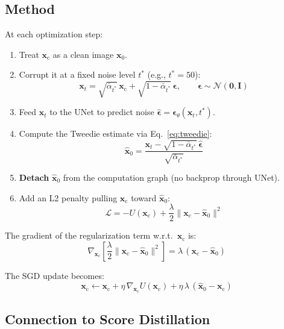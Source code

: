 \documentclass[11pt]{article}
\newcommand{\xb}{\mathbf{x}}
\newcommand{\xc}{\xb_{\mathrm{c}}}  %
\newcommand{\eb}{\boldsymbol{\epsilon}}
\newcommand{\Ib}{\mathbf{I}}
\newcommand{\alphabar}{\bar{\alpha}}
\begin{document}
\subsection{Method}

At each optimization step:
\begin{enumerate}[nosep]
    \item Treat $\xc$ as a clean image $\xb_0$.
    \item Corrupt it at a fixed noise level $t^*$ (e.g., $t^* = 50$):
    \begin{equation}
        \xb_t = \sqrt{\alphabar_{t^*}}\, \xc + \sqrt{1 - \alphabar_{t^*}}\, \eb,
        \qquad \eb \sim \mathcal{N}(\mathbf{0}, \Ib)
        \label{eq:corrupt}
    \end{equation}
    \item Feed $\xb_t$ to the UNet to predict noise $\hat{\eb} = \eb_\theta(\xb_t, t^*)$.
    \item Compute the Tweedie estimate via Eq.~\eqref{eq:tweedie}:
    \begin{equation}
        \hat{\xb}_0 = \frac{\xb_t - \sqrt{1-\alphabar_{t^*}}\,\hat{\eb}}{\sqrt{\alphabar_{t^*}}}
    \end{equation}
    \item \textbf{Detach} $\hat{\xb}_0$ from the computation graph (no backprop through UNet).
    \item Add an L2 penalty pulling $\xc$ toward $\hat{\xb}_0$:
    \begin{equation}
        \mathcal{L} = -U(\xc) + \frac{\lambda}{2} \|\xc - \hat{\xb}_0\|^2
        \label{eq:loss_l2}
    \end{equation}
\end{enumerate}

The gradient of the regularization term w.r.t.\ $\xc$ is:
\begin{equation}
    \nabla_{\xc} \left[\frac{\lambda}{2}\|\xc - \hat{\xb}_0\|^2\right]
    = \lambda\,(\xc - \hat{\xb}_0)
\end{equation}

The SGD update becomes:
\begin{equation}
    \xc \leftarrow \xc + \eta\,\nabla_{\xc} U(\xc)
    + \eta\,\lambda\,(\hat{\xb}_0 - \xc)
    \label{eq:update_l2}
\end{equation}

\subsection{Connection to Score Distillation}
\end{document}
